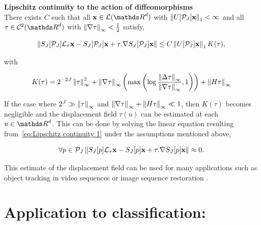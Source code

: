 \documentclass[a4paper,11pt]{report}
\begin{document}
			\begin{thm} \textbf{Lipschitz continuity to the action of diffeomorphisms} \\
			  There exists $C$ such that all $\bfx \in \mcalL(\dsR^{d})$ with $\left\lVert U[\mathcal{P}_{J}]{\bf x} \right\rVert_{1} < \infty$ and all $\tau \in \mcalC^{2}(\dsR^{d})$ with $\left\lVert \nabla \tau \right\rVert_{\infty} < \frac{1}{2}$ satisfy,
			  
			  \begin{equation}
					\left\lVert S_{J}[\mathcal{P}_{J}]\mathcal{L}_{\tau}{\bf x} - S_{J}[\mathcal{P}_{J}]{\bf x} + \tau . \nabla S_{J}[\mathcal{P}_{J}]{\bf x} \right\rVert \leq C \left\lVert U[\mathcal{P}_{J}]{\bf x} \right\rVert_{1} K(\tau),
					\label{eq:Lipschitz continuity 1}
			  \end{equation}

			  with
			  
			  \begin{equation}
					K(\tau) = 2^{-2J} \left\lVert \tau \right\rVert_{\infty}^{2} + \left\lVert \nabla \tau \right\rVert_{\infty} \left(\max \left( \log \frac{\left\lVert \Delta \tau \right\rVert_{\infty}}{\left\lVert \nabla \tau \right\rVert_{\infty}},1 \right) \right) + \left\lVert H\tau \right\rVert_{\infty} 
					\label{eq:Lipschitz continuity K(tau)}
			  \end{equation}
			  
			  \label{thm:Lipschitz continuity}
			\end{thm}
			
			\begin{rem}
				If the case where $2^{J} \gg \left\lVert \tau \right\rVert_{\infty}$ and $\left\lVert \nabla \tau \right\rVert_{\infty} + \left\lVert H \tau \right\rVert_{\infty} \ll 1$, then $K(\tau)$ becomes negligible and the displacement field $\tau(u)$ can be estimated at each $u \in \dsR^{d}$. This can be done by solving the linear equation resulting from~\ref{eq:Lipschitz continuity 1} under the assumptions mentioned above,
				
				\begin{equation}
					\forall p \in \mathcal{P}_{J} \left\lVert S_{J}[p]\mathcal{L}_{\tau}{\bf x} - S_{J}[p]{\bf x} + \tau . \nabla S_{J}[p]{\bf x} \right\rVert \approx 0.
					\label{eq:Lipschitz continuity 2}  
				\end{equation}
				
				This estimate of the displacement field can be used for many applications such as object tracking in video sequences or image sequence restoration \cite{brailean1996recursive}.
			\end{rem}
			
		
  \section{Application to classification:}
    \label{sec:ST/Applications to clf}
    
\end{document}

